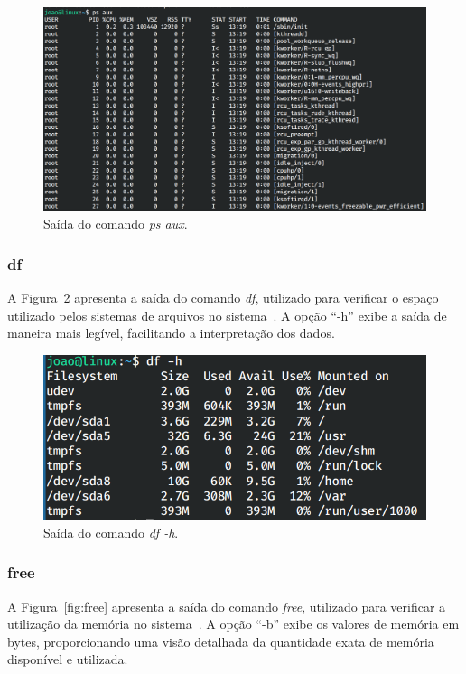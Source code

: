 \documentclass[
	12pt,				%
	oneside,   	        %
	a4paper,			%
	english,			%
	french,				%
	spanish,			%
	brazil,				%
	]{pacotes/abntex2}
\begin{document}
\begin{figure}[H]
  \centering
  \includegraphics[scale=0.37]{figuras/ps_aux.png}
  \caption{Saída do comando \textit{ps aux}.}
  \label{fig:ps}
\end{figure}

\subsubsection{df}
A Figura~\ref{fig:df} apresenta a saída do comando \textit{df}, utilizado para verificar o espaço utilizado pelos sistemas de arquivos no sistema~\cite{manDf}. A opção ``-h'' exibe a saída de maneira mais legível, facilitando a interpretação dos dados.

\begin{figure}[H]
  \centering
  \includegraphics[scale=0.5]{figuras/df.png}
  \caption{Saída do comando \textit{df -h}.}
  \label{fig:df}
\end{figure}

\subsubsection{free}
A Figura~\ref{fig:free} apresenta a saída do comando \textit{free}, utilizado para verificar a utilização da memória no sistema~\cite{manFree}. A opção ``-b'' exibe os valores de memória em bytes, proporcionando uma visão detalhada da quantidade exata de memória disponível e utilizada.
\end{document}
